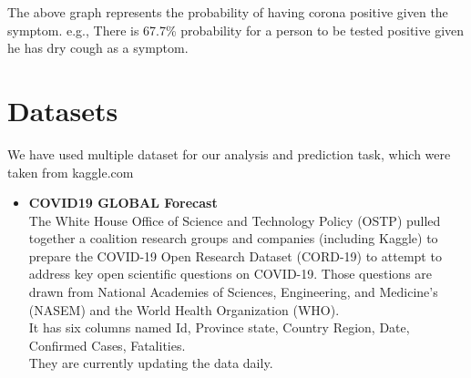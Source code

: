 \documentclass{article}
\begin{document}
The above graph represents the probability of having corona positive given the symptom. e.g., There is 67.7\% probability for a person to be tested positive given he has dry cough as a symptom.

\section*{Datasets}
We have used multiple dataset for our analysis and prediction task, which were taken from kaggle.com
\begin{itemize}
\item \textbf{COVID19 GLOBAL Forecast}
\newline
\\The White House Office of Science and Technology Policy (OSTP) pulled together a coalition research groups and companies (including Kaggle) to prepare the COVID-19 Open Research Dataset (CORD-19) to attempt to address key open scientific questions on COVID-19. Those questions are drawn from National Academies of Sciences, Engineering, and Medicine’s (NASEM) and the World Health Organization (WHO).
\\It has six columns named Id, Province state, Country Region, Date, Confirmed Cases, Fatalities.
\\They are currently updating the data daily.


\end{itemize}
\end{document}
